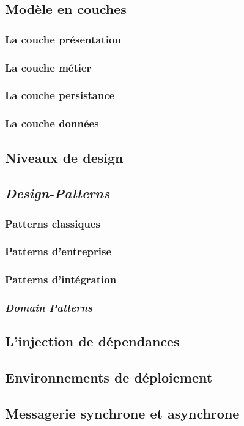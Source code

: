 \documentclass{article}
\begin{document}
\subsection{Modèle en couches}
\subsubsection{La couche présentation}
\subsubsection{La couche métier}
\subsubsection{La couche persistance}
\subsubsection{La couche données}
\subsection{Niveaux de design}
\subsection{\emph{Design-Patterns}}
\subsubsection{Patterns classiques}
\subsubsection{Patterns d'entreprise}
\subsubsection{Patterns d'intégration}
\subsubsection{\emph{Domain Patterns}}
\subsection{L'injection de dépendances}
\subsection{Environnements de déploiement}
\subsection{Messagerie synchrone et asynchrone}
\end{document}
